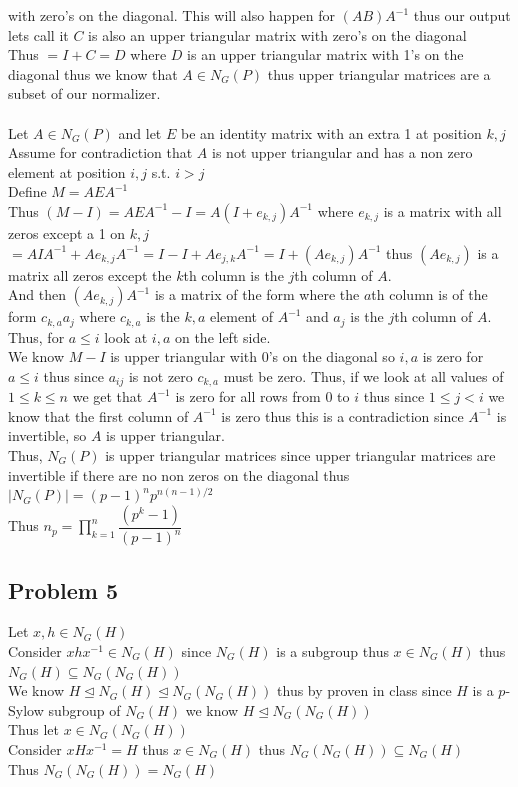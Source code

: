 \documentclass[12pt,letterpaper]{article}
\theoremstyle{definition}
\begin{document}
with zero's on the diagonal. This will also happen for $(AB)A^{-1}$ thus our output lets call it $C$ is also an upper triangular matrix with zero's on the diagonal\\
Thus $=I+C=D$ where $D$ is an upper triangular matrix with 1's on the diagonal thus we know that $A \in N_G(P)$ thus upper triangular matrices are a subset of our normalizer.\\
\phantom{text}\\
Let $A \in N_G(P)$ and let $E$ be an identity matrix with an extra 1 at position $k,j$\\
Assume for contradiction that $A$ is not upper triangular and has a non zero element at position $i,j$ s.t. $i>j$\\
Define $M=AEA^{-1}$\\
Thus $(M-I)=AEA^{-1}-I=A(I+e_{k,j})A^{-1}$ where $e_{k,j}$ is a matrix with all zeros except a 1 on $k,j$\\
$=AIA^{-1}+Ae_{k,j}A^{-1}=I-I+Ae_{j,k}A^{-1}=I+(Ae_{k,j})A^{-1}$ thus $(Ae_{k,j})$ is a matrix all zeros except the $k$th column is the $j$th column of $A$.\\
And then $(Ae_{k,j})A^{-1}$ is a matrix of the form where the $a$th column is of the form $c_{k,a}a_j$ where $c_{k,a}$ is the $k,a$ element of $A^{-1}$ and $a_j$ is the $j$th column of $A$. Thus, for $a\leq i$ look at $i,a$ on the left side.\\
We know $M-I$ is upper triangular with 0's on the diagonal so $i,a$ is zero for $a \leq i$ thus since $a_{ij}$ is not zero $c_{k,a}$ must be zero. Thus, if we look at all values of $1 \leq k \leq n$ we get that $A^{-1}$ is zero for all rows from 0 to $i$ thus since $1\leq j < i$
we know that the first column of $A^{-1}$ is zero thus this is a contradiction since $A^{-1}$ is invertible, so $A$ is upper triangular.\\
Thus, $N_G(P)$ is upper triangular matrices since upper triangular matrices are invertible if there are no non zeros on the diagonal thus $|N_G(P)|=(p-1)^np^{n(n-1)/2}$\\
Thus $n_p=\prod\limits_{k=1}^n\dfrac{(p^k-1)}{(p-1)^n}$


\newpage
\subsection*{Problem 5}
Let $x,h \in N_G(H)$\\
Consider $xhx^{-1} \in N_G(H)$ since $N_G(H)$ is a subgroup thus $x \in N_G(H)$ thus $N_G(H) \subseteq N_G(N_G(H))$\\
We know $H \unlhd N_G(H) \unlhd N_G(N_G(H))$ thus by proven in class since $H$ is a $p$-Sylow subgroup of $N_G(H)$ we know $H \unlhd N_G(N_G(H))$\\
Thus let $x \in N_G(N_G(H))$\\
Consider $xHx^{-1}=H $ thus $x \in N_G(H)$ thus $N_G(N_G(H)) \subseteq N_G(H)$\\
Thus $N_G(N_G(H))=N_G(H)$ 
\end{document}
